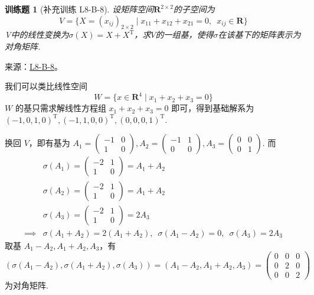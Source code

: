 \documentclass[12pt,fontset=fandol]{ctexart}
\newtheorem{exercise}{训练题}[section]
\begin{document}
\begin{exercise}[补充训练 L8-B-8]\label{prob:L8-B-8}
设矩阵空间$\mathbf{R}^{2\times 2}$的子空间为
        \[V=\{X=(x_{ij})_{2\times 2} \mid x_{11}+x_{12}+x_{21}=0,\enspace x_{ij}\in \mathbf{R}\}\]
        V中的线性变换为$\sigma(X)=X+X^\mathrm{T}$，求$V$的一组基，使得$\sigma$在该基下的矩阵表示为对角矩阵.
\end{exercise}
\noindent 来源：\href{https://github.com/yhwu-is/Linear-Algebra-Left-Undone/blob/new/%E8%AE%B2%E4%B9%89/%E4%B8%93%E9%A2%98/8%20%E7%9B%B8%E6%8A%B5%E6%A0%87%E5%87%86%E5%BD%A2.tex}{L8-B-8}。
\begin{solve}
我们可以类比线性空间
          \[ W = \{ x \in \mathbf{R}^4 \mid x_1 + x_2 + x_3 = 0 \} \]
          $ W $ 的基只需求解线性方程组 $ x_1 + x_2 + x_3 = 0 $ 即可，得到基础解系为 $ (-1, 0, 1, 0)^{\mathrm{T}},\allowbreak (-1, 1, 0, 0)^{\mathrm{T}},\allowbreak (0, 0, 0, 1)^{\mathrm{T}} $.

          换回 $ V $，即有基为 $ A_1 = \begin{pmatrix} -1 & 0 \\ 1 & 0 \end{pmatrix}, A_2 = \begin{pmatrix} -1 & 1 \\ 0 & 0 \end{pmatrix}, A_3 = \begin{pmatrix} 0 & 0 \\ 0 & 1 \end{pmatrix} $. 而
          \begin{align*}
                         & \sigma(A_1) = \begin{pmatrix} -2 & 1 \\ 1 & 0 \end{pmatrix} = A_1 + A_2                      \\
                         & \sigma(A_2) = \begin{pmatrix} -2 & 1 \\ 1 & 0 \end{pmatrix} = A_1 + A_2                      \\
                         & \sigma(A_3) = \begin{pmatrix} -2 & 1 \\ 1 & 0 \end{pmatrix} = 2 A_3                          \\
              \implies{} & \sigma(A_1 + A_2) = 2(A_1 + A_2),\enspace \sigma(A_1 - A_2) = 0,\enspace \sigma(A_3) = 2 A_3
          \end{align*}
          取基 $ A_1 - A_2, A_1 + A_2, A_3 $，有
          \[ (\sigma(A_1 - A_2), \sigma(A_1 + A_2), \sigma(A_3)) = (A_1 - A_2, A_1 + A_2, A_3) = \begin{pmatrix}
                  0 & 0 & 0 \\
                  0 & 2 & 0 \\
                  0 & 0 & 2
              \end{pmatrix} \]
          为对角矩阵.
\end{solve}
\end{document}
